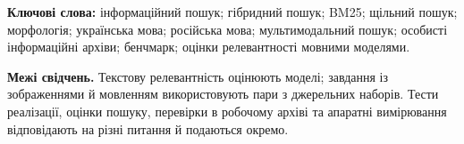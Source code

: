 \documentclass[11pt]{article}
\begin{document}
\noindent\textbf{Ключові слова:} інформаційний пошук; гібридний пошук; BM25; щільний пошук; морфологія; українська мова; російська мова; мультимодальний пошук; особисті інформаційні архіви; бенчмарк; оцінки релевантності мовними моделями.

\medskip
\noindent\textbf{Межі свідчень.} Текстову релевантність оцінюють моделі; завдання із зображеннями й мовленням використовують пари з джерельних наборів. Тести реалізації, оцінки пошуку, перевірки в робочому архіві та апаратні вимірювання відповідають на різні питання й подаються окремо.







\clearpage

\clearpage








\appendix

\clearpage

\end{document}
